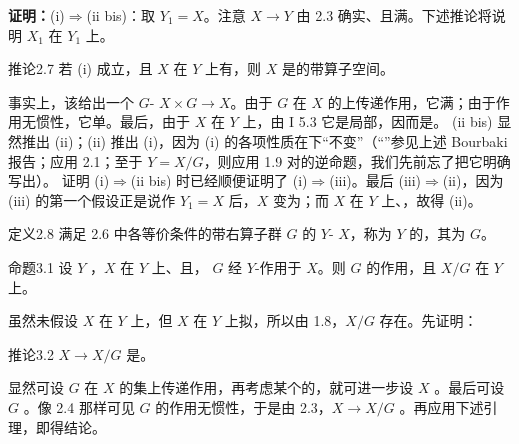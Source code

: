 \textbf{证明：}(i)$\Rightarrow$(ii bis)：取 $Y_1=X$。注意 $X\to Y$ 由 2.3 确实、且满。下述推论将说明 $X_1$ 在 $Y_1$ 上。
\begin{SGAresult}{推论}{2.7}
若 (i) 成立，且 $X$ 在 $Y$ 上有，则 $X$ 是的带算子空间。
\end{SGAresult}
事实上，该给出一个 $G$- $X\times G\to X$。由于 $G$ 在 $X$ 的上传递作用，它满；由于作用无惯性，它单。最后，由于 $X$ 在 $Y$ 上，由 I 5.3 它是局部，因而是。
(ii bis) 显然推出 (ii)；(ii) 推出 (i)，因为 (i) 的各项性质在下“不变”（“”参见上述 Bourbaki 报告；应用 2.1；至于 $Y=X/G$，则应用 1.9 对的逆命题，我们先前忘了把它明确写出）。
证明 (i)$\Rightarrow$(ii bis) 时已经顺便证明了 (i)$\Rightarrow$(iii)。最后 (iii)$\Rightarrow$(ii)，因为 (iii) 的第一个假设正是说作 $Y_1=X$ 后，$X$ 变为；而 $X$ 在 $Y$ 上、，故得 (ii)。
\begin{SGAresult}{定义}{2.8}
满足 2.6 中各等价条件的带右算子群 $G$ 的 $Y$- $X$，称为 $Y$ 的，其为 $G$。
\end{SGAresult}
\begin{SGAresult}{命题}{3.1}
设 $Y$ ，$X$ 在 $Y$ 上、且， $G$ 经 $Y$-作用于 $X$。则 $G$ 的作用，且 $X/G$ 在 $Y$ 上。
\end{SGAresult}
虽然未假设 $X$ 在 $Y$ 上，但 $X$ 在 $Y$ 上拟，所以由 1.8，$X/G$ 存在。先证明：
\begin{SGAresult}{推论}{3.2}
$X\to X/G$ 是。
\end{SGAresult}
显然可设 $G$ 在 $X$ 的集上传递作用，再考虑某个的，就可进一步设 $X$ 。最后可设 $G$ 。像 2.4 那样可见 $G$ 的作用无惯性，于是由 2.3，$X\to X/G$ 。再应用下述引理，即得结论。
